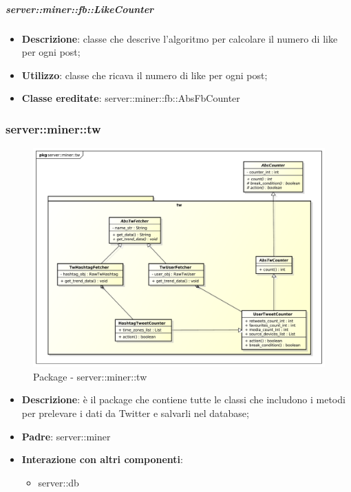 	\subparagraph{server::miner::fb::LikeCounter} %
		\label{subp:server_miner_fb_LikeCounter}
			\begin{itemize}
				\item \textbf{Descrizione}: classe che descrive l'algoritmo per calcolare il numero di like per ogni post;
				\item \textbf{Utilizzo}: classe che ricava il numero di like per ogni post;
				\item \textbf{Classe ereditate}: server::miner::fb::AbsFbCounter
			\end{itemize}

\subsubsection{server::miner::tw} %
\label{ssub:bdsm_app_server_miner_tw}
\begin{figure}[htbp]
	\centering
	\centerline{\includegraphics[scale=0.4]{./images/server/miner_tw.pdf}}
	\caption{Package - server::miner::tw}
\end{figure}

\begin{itemize}
  \item \textbf{Descrizione}: è il package che contiene tutte le classi che includono i metodi per prelevare i dati da Twitter e salvarli nel database;
  \item \textbf{Padre}: server::miner
  \item \textbf{Interazione con altri componenti}:
  	\begin{itemize}
  		\item server::db
  	\end{itemize}
\end{itemize}

